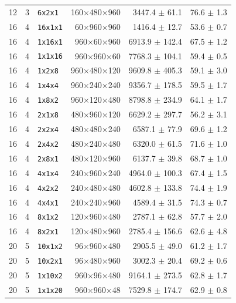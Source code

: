 \begin{longtable}{rrlrrr}
12 & 3 & \texttt{6x2x1} & 160$\times$480$\times$960 & 3447.4 $\pm$ 61.1 & 76.6 $\pm$ 1.3 \\
16 & 4 & \texttt{16x1x1} & 60$\times$960$\times$960 & 1416.4 $\pm$ 12.7 & 53.6 $\pm$ 0.7 \\
16 & 4 & \texttt{1x16x1} & 960$\times$60$\times$960 & 6913.9 $\pm$ 142.4 & 67.5 $\pm$ 1.2 \\
16 & 4 & \texttt{1x1x16} & 960$\times$960$\times$60 & 7768.3 $\pm$ 104.1 & 59.4 $\pm$ 0.5 \\
16 & 4 & \texttt{1x2x8} & 960$\times$480$\times$120 & 9609.8 $\pm$ 405.3 & 59.1 $\pm$ 3.0 \\
16 & 4 & \texttt{1x4x4} & 960$\times$240$\times$240 & 9356.7 $\pm$ 178.5 & 59.5 $\pm$ 1.7 \\
16 & 4 & \texttt{1x8x2} & 960$\times$120$\times$480 & 8798.8 $\pm$ 234.9 & 64.1 $\pm$ 1.7 \\
16 & 4 & \texttt{2x1x8} & 480$\times$960$\times$120 & 6629.2 $\pm$ 297.7 & 56.2 $\pm$ 3.1 \\
16 & 4 & \texttt{2x2x4} & 480$\times$480$\times$240 & 6587.1 $\pm$ 77.9 & 69.6 $\pm$ 1.2 \\
16 & 4 & \texttt{2x4x2} & 480$\times$240$\times$480 & 6320.0 $\pm$ 61.5 & 71.6 $\pm$ 1.0 \\
16 & 4 & \texttt{2x8x1} & 480$\times$120$\times$960 & 6137.7 $\pm$ 39.8 & 68.7 $\pm$ 1.0 \\
16 & 4 & \texttt{4x1x4} & 240$\times$960$\times$240 & 4964.0 $\pm$ 100.3 & 67.4 $\pm$ 1.5 \\
16 & 4 & \texttt{4x2x2} & 240$\times$480$\times$480 & 4602.8 $\pm$ 133.8 & 74.4 $\pm$ 1.9 \\
16 & 4 & \texttt{4x4x1} & 240$\times$240$\times$960 & 4589.4 $\pm$ 31.5 & 74.3 $\pm$ 0.7 \\
16 & 4 & \texttt{8x1x2} & 120$\times$960$\times$480 & 2787.1 $\pm$ 62.8 & 57.7 $\pm$ 2.0 \\
16 & 4 & \texttt{8x2x1} & 120$\times$480$\times$960 & 2785.4 $\pm$ 156.6 & 62.6 $\pm$ 4.8 \\
20 & 5 & \texttt{10x1x2} & 96$\times$960$\times$480 & 2905.5 $\pm$ 49.0 & 61.2 $\pm$ 1.7 \\
20 & 5 & \texttt{10x2x1} & 96$\times$480$\times$960 & 3002.3 $\pm$ 20.4 & 69.2 $\pm$ 0.6 \\
20 & 5 & \texttt{1x10x2} & 960$\times$96$\times$480 & 9164.1 $\pm$ 273.5 & 62.8 $\pm$ 1.7 \\
20 & 5 & \texttt{1x1x20} & 960$\times$960$\times$48 & 7529.8 $\pm$ 174.7 & 62.9 $\pm$ 0.8 \\

\end{longtable}
